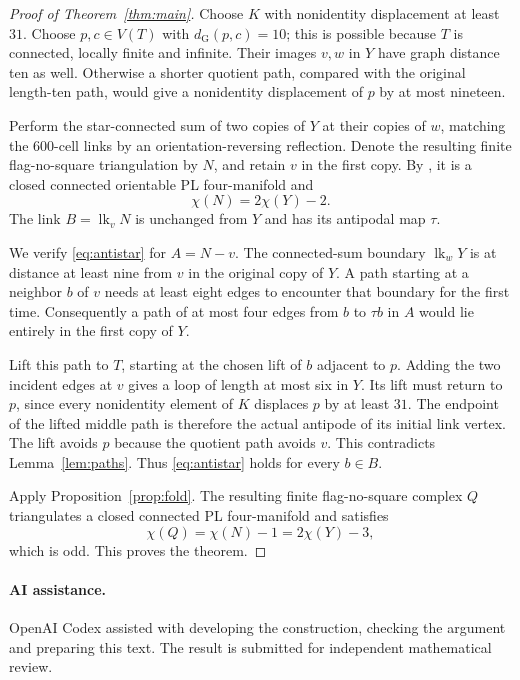 \documentclass[11pt]{article}
\newcommand{\lk}{\operatorname{lk}}
\newcommand{\dist}{d_{\mathrm G}}
\begin{document}
\begin{proof}[Proof of Theorem~\ref{thm:main}]
Choose $K$ with nonidentity displacement at least $31$.
Choose $p,c\in V(T)$ with $\dist(p,c)=10$; this is possible
because $T$ is connected, locally finite and infinite.
Their images $v,w$ in $Y$ have graph distance ten as well.
Otherwise a shorter quotient path, compared with the original
length-ten path, would give a nonidentity displacement of $p$
by at most nineteen.

Perform the star-connected sum of two copies of $Y$ at their
copies of $w$, matching the $600$-cell links by an
orientation-reversing reflection. Denote the resulting finite
flag-no-square triangulation by $N$, and retain $v$ in the first copy.
By \cite[Lemma~1.3]{KNS}, it is a closed connected orientable
PL four-manifold and
\[
  \chi(N)=2\chi(Y)-2.
\]
The link $B=\lk_v N$ is unchanged from $Y$ and has its antipodal
map $\tau$.

We verify \eqref{eq:antistar} for $A=N-v$.
The connected-sum boundary $\lk_w Y$ is at distance at least
nine from $v$ in the original copy of $Y$.
A path starting at a neighbor $b$ of $v$ needs at least eight
edges to encounter that boundary for the first time.
Consequently a path of at most four edges from $b$ to $\tau b$
in $A$ would lie entirely in the first copy of $Y$.

Lift this path to $T$, starting at the chosen lift of $b$
adjacent to $p$. Adding the two incident edges at $v$ gives
a loop of length at most six in $Y$.
Its lift must return to $p$, since every nonidentity element
of $K$ displaces $p$ by at least $31$.
The endpoint of the lifted middle path is therefore the actual
antipode of its initial link vertex. The lift avoids $p$
because the quotient path avoids $v$.
This contradicts Lemma~\ref{lem:paths}.
Thus \eqref{eq:antistar} holds for every $b\in B$.

Apply Proposition~\ref{prop:fold}. The resulting finite
flag-no-square complex $Q$ triangulates a closed connected
PL four-manifold and satisfies
\[
  \chi(Q)=\chi(N)-1=2\chi(Y)-3,
\]
which is odd. This proves the theorem.
\end{proof}

\paragraph{AI assistance.}
OpenAI Codex assisted with developing the construction, checking the
argument and preparing this text. The result is submitted for
independent mathematical review.
\end{document}
